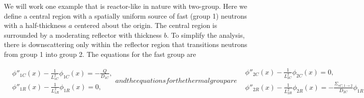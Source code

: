 We will work one example that is reactor-like in nature with two-group. Here we define a central region with a spatially uniform source of fast (group 1) neutrons with a half-thickness $a$ centered about the origin. The central region is surrounded by a moderating reflector with thickness $b$. To simplify the analysis, there is downscattering only within the reflector region that transitions neutrons from group 1 into group 2. The equations for the fast group are
\begin{subequations}
\begin{align}
  &\phi''_{1C}(x) - \frac{1}{L_{1C}^2} \phi_{1C}(x) = -\frac{Q}{D_{1C}}, \\
  &\phi''_{1R}(x) - \frac{1}{L_{1R}^2} \phi_{1R}(x) = 0,
\end{align}
and the equations for the thermal group are
\begin{align}
  &\phi''_{2C}(x) - \frac{1}{L_{2C}^2} \phi_{2C}(x) = 0, \\
  &\phi''_{2R}(x) - \frac{1}{L_{2R}^2} \phi_{2R}(x) = -\frac{\Sigma_{sC,1 \rightarrow 2}}{D_{2C}} \phi_{1R}(x).
\end{align}
The boundary conditions are
\begin{align}
  &J_{1C}(0) = 0, \\
  &J_{2C}(0) = 0, \\
  &\lim_{x \rightarrow \infty} \phi_{1R}(x) < \infty, \\
  &\lim_{x \rightarrow \infty} \phi_{2R}(x) < \infty.
\end{align}
\end{subequations}

